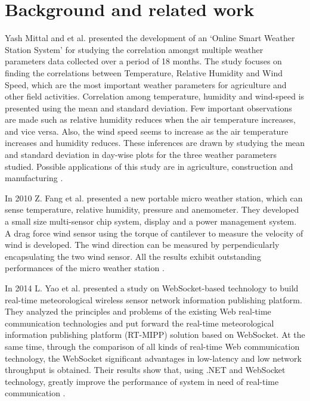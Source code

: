 \section{Background and related work}
\label{sec:background}
Yash Mittal and et al. presented the development of an ‘Online Smart Weather
Station System’ for studying the correlation amongst multiple weather parameters
data collected over a period of 18 months. The study focuses on finding the
correlations between Temperature, Relative Humidity and Wind Speed, which are
the most important weather parameters for agriculture and other field activities.
Correlation among temperature, humidity and wind-speed is presented using the mean
and standard deviation. Few important observations are made such as relative humidity
reduces when the air temperature increases, and vice versa. Also, the wind
speed seems to increase as the air temperature increases and humidity reduces.
These inferences are drawn by studying the mean and standard deviation in
day-wise plots for the three weather parameters studied. Possible
applications of this study are in agriculture, construction and manufacturing \cite{7443621}.

In 2010 Z. Fang et al. presented a new portable micro weather station, which can sense temperature,
relative humidity, pressure and anemometer. They developed a small size multi-sensor chip system, display and a
power management system. A drag force wind sensor using the torque of cantilever to measure the velocity of wind is developed.
The wind direction can be measured by perpendicularly encapsulating the two wind sensor. All the results exhibit outstanding performances
of the micro weather station \cite{5592239}.

In 2014 L. Yao et al. presented a study on WebSocket-based technology to build real-time meteorological wireless sensor network
information publishing platform. They analyzed the principles and problems of the existing Web real-time communication technologies and put
forward the real-time meteorological information publishing platform (RT-MIPP) solution based on WebSocket. At the same time, through the
comparison of all kinds of real-time Web communication technology, the WebSocket significant advantages in low-latency and low network
throughput is obtained. Their results show that, using .NET and WebSocket technology, greatly improve the performance of system in need of real-time
communication \cite{6975834}.
